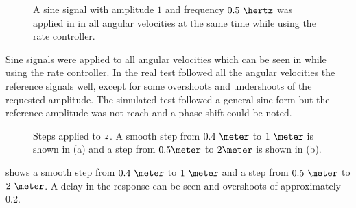 \begin{figure}
\centering
  \qquad
  \qquad
  \qquad
  \qquad
  \qquad
  \caption{\label{fig:SinAllRate}%
  A sine signal with amplitude $1$ and frequency $0.5\ \hertz$ was applied in in all angular velocities at the same time while using the rate controller.}
\end{figure}

Sine signals were applied to all angular velocities which can be seen in  while using the rate controller. In the real test followed all the angular velocities the reference signals well, except for some overshoots and undershoots of the requested amplitude. The simulated test followed a general sine form but the reference amplitude was not reach and a phase shift could be noted.

\begin{figure}[tbp]
  \centering
  \qquad
  \caption{\label{fig:StepD}%
    Steps applied to $z$. A smooth step from $0.4\ \meter$ to $1\ \meter$ is shown in (a) and a step from $0.5 \meter$ to $2 \meter$ is shown in (b).}
\end{figure}

 shows a smooth step from $0.4\ \meter$ to $1\ \meter$ and a step from $0.5\ \meter$ to $2\ \meter$. A delay in the response can be seen and overshoots of approximately 0.2.

